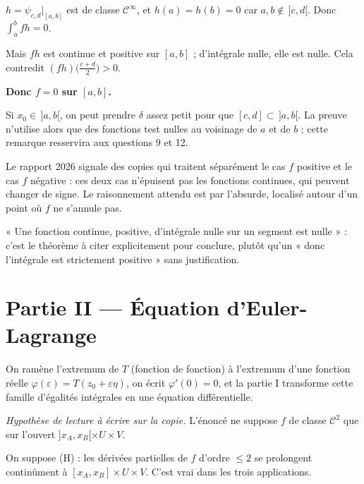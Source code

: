 \documentclass[11pt,a4paper]{article}
\begin{document}
\(h=\psi_{c,d}|_{[a,b]}\) est de classe \(\mathcal C^\infty\), et \(h(a)=h(b)=0\) car \(a,b\notin\,]c,d[\). Donc \(\int_a^bfh=0\).

Mais \(fh\) est continue et positive sur \([a,b]\) ; d'intégrale nulle, elle est nulle. Cela contredit \((fh)\big(\frac{c+d}2\big)>0\).

\textbf{Donc \(f=0\) sur \([a,b]\).}

Si \(x_0\in\,]a,b[\), on peut prendre \(\delta\) assez petit pour que \([c,d]\subset\,]a,b[\). La preuve n'utilise alors que des fonctions test nulles au voisinage de \(a\) et de \(b\) ; cette remarque resservira aux questions 9 et 12.

\begin{piege}

Le rapport 2026 signale des copies qui traitent séparément le cas \(f\) positive et le cas \(f\) négative : ces deux cas n'épuisent pas les fonctions continues, qui peuvent changer de signe. Le raisonnement attendu est par l'absurde, localisé autour d'un point où \(f\) ne s'annule pas.

\end{piege}

\begin{methode}

« Une fonction continue, positive, d'intégrale nulle sur un segment est nulle » : c'est le théorème à citer explicitement pour conclure, plutôt qu'un « donc l'intégrale est strictement positive » sans justification.

\end{methode}

\hypertarget{partie-ii-uxe9quation-deuler-lagrange}{%
\section{Partie II --- Équation d'Euler-Lagrange}\label{partie-ii-uxe9quation-deuler-lagrange}}

On ramène l'extremum de \(T\) (fonction de fonction) à l'extremum d'une fonction réelle \(\varphi(\varepsilon)=T(z_0+\varepsilon\eta)\), on écrit \(\varphi'(0)=0\), et la partie I transforme cette famille d'égalités intégrales en une équation différentielle.

\emph{Hypothèse de lecture à écrire sur la copie.} L'énoncé ne suppose \(f\) de classe \(\mathcal C^2\) que sur l'ouvert \(]x_A,x_B[\times U\times V\).

On suppose (H) : les dérivées partielles de \(f\) d'ordre \(\le2\) se prolongent continûment à \([x_A,x_B]\times U\times V\). C'est vrai dans les trois applications.
\end{document}
